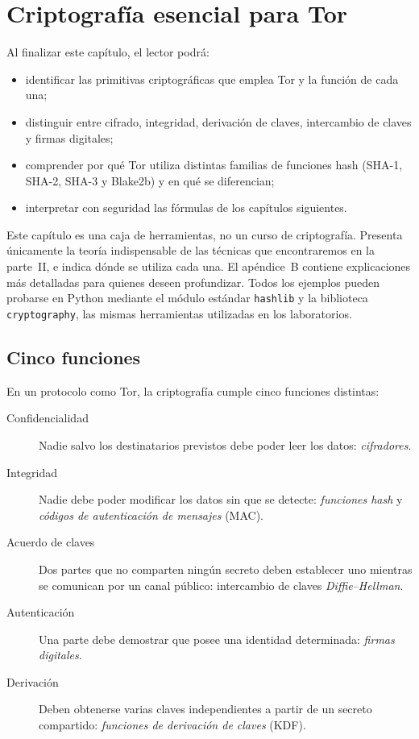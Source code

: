 \chapter{Criptografía esencial para Tor}\label{cap:05-crittografia}

\begin{obiettivi}
Al finalizar este capítulo, el lector podrá:
\begin{itemize}[nosep]
  \item identificar las primitivas criptográficas que emplea Tor y la función de cada una;
  \item distinguir entre cifrado, integridad, derivación de claves, intercambio de claves y firmas digitales;
  \item comprender por qué Tor utiliza distintas familias de funciones hash (SHA-1, SHA-2, SHA-3 y Blake2b) y en qué se diferencian;
  \item interpretar con seguridad las fórmulas de los capítulos siguientes.
\end{itemize}
\end{obiettivi}

Este capítulo es una caja de herramientas, no un curso de criptografía. Presenta únicamente la teoría indispensable de las técnicas que encontraremos en la parte~II, e indica dónde se utiliza cada una. El apéndice~B contiene explicaciones más detalladas para quienes deseen profundizar. Todos los ejemplos pueden probarse en Python mediante el módulo estándar \texttt{hashlib} y la biblioteca \texttt{cryptography}, las mismas herramientas utilizadas en los laboratorios.

\section{Cinco funciones}\label{sec:cripto-compiti}

En un protocolo como Tor, la criptografía cumple cinco funciones distintas:
\begin{description}
  \item[Confidencialidad] Nadie salvo los destinatarios previstos debe poder leer los datos: \emph{cifradores}.
  \item[Integridad] Nadie debe poder modificar los datos sin que se detecte: \emph{funciones hash} y \emph{códigos de autenticación de mensajes} (MAC).
  \item[Acuerdo de claves] Dos partes que no comparten ningún secreto deben establecer uno mientras se comunican por un canal público: intercambio de claves \emph{Diffie--Hellman}.
  \item[Autenticación] Una parte debe demostrar que posee una identidad determinada: \emph{firmas digitales}.
  \item[Derivación] Deben obtenerse varias claves independientes a partir de un secreto compartido: \emph{funciones de derivación de claves} (KDF).
\end{description}

